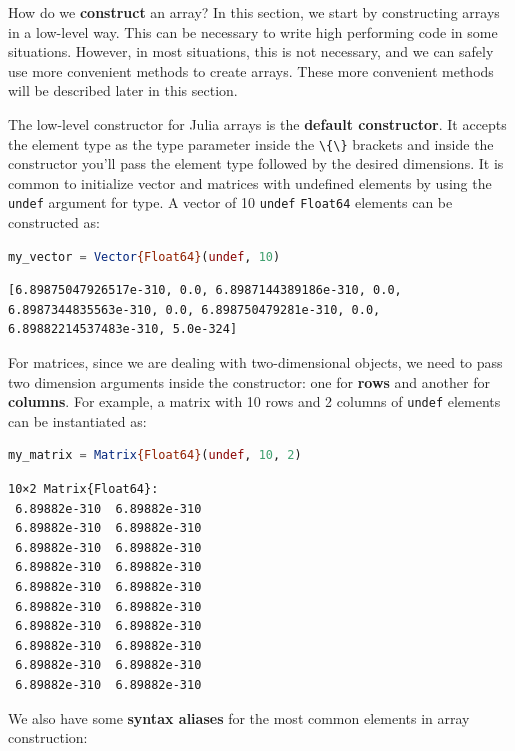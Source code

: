 \documentclass[
  notoc %
]{tufte-book}
\newcommand{\passthrough}[1]{#1}
\begin{document}
How do we \textbf{construct} an array? In this section, we start by
constructing arrays in a low-level way. This can be necessary to write
high performing code in some situations. However, in most situations,
this is not necessary, and we can safely use more convenient methods to
create arrays. These more convenient methods will be described later in
this section.

The low-level constructor for Julia arrays is the \textbf{default
constructor}. It accepts the element type as the type parameter inside
the \passthrough{\lstinline!\{\}!} brackets and inside the constructor
you'll pass the element type followed by the desired dimensions. It is
common to initialize vector and matrices with undefined elements by
using the \passthrough{\lstinline!undef!} argument for type. A vector of
10 \passthrough{\lstinline!undef!} \passthrough{\lstinline!Float64!}
elements can be constructed as:

\begin{lstlisting}[language=Julia]
my_vector = Vector{Float64}(undef, 10)
\end{lstlisting}

\begin{lstlisting}[language=Output]
[6.89875047926517e-310, 0.0, 6.8987144389186e-310, 0.0, 6.8987344835563e-310, 0.0, 6.898750479281e-310, 0.0, 6.89882214537483e-310, 5.0e-324]
\end{lstlisting}

For matrices, since we are dealing with two-dimensional objects, we need
to pass two dimension arguments inside the constructor: one for
\textbf{rows} and another for \textbf{columns}. For example, a matrix
with 10 rows and 2 columns of \passthrough{\lstinline!undef!} elements
can be instantiated as:

\begin{lstlisting}[language=Julia]
my_matrix = Matrix{Float64}(undef, 10, 2)
\end{lstlisting}

\begin{lstlisting}[language=Output]
10×2 Matrix{Float64}:
 6.89882e-310  6.89882e-310
 6.89882e-310  6.89882e-310
 6.89882e-310  6.89882e-310
 6.89882e-310  6.89882e-310
 6.89882e-310  6.89882e-310
 6.89882e-310  6.89882e-310
 6.89882e-310  6.89882e-310
 6.89882e-310  6.89882e-310
 6.89882e-310  6.89882e-310
 6.89882e-310  6.89882e-310
\end{lstlisting}

We also have some \textbf{syntax aliases} for the most common elements
in array construction:
\end{document}
